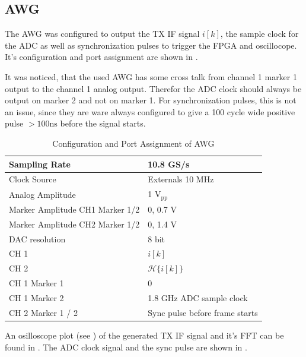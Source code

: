 \subsection{\gls{AWG}}
The \gls{AWG} was configured to output the \gls{TX} \gls{IF} signal $i[k]$,
the sample clock for the \gls{ADC} as well as synchronization pulses to trigger
the \gls{FPGA} and oscillocope. It's configuration and port assignment
are shown in .

It was noticed, that the used \gls{AWG} has some cross talk from
channel 1 marker 1 output to the channel 1 analog output. Therefor the
\gls{ADC} clock should always be output on marker 2 and not on marker 1.
For synchronization pulses, this is not an issue, since they are ware always
configured to give a 100 cycle wide positive pulse $> 100 \text{ns}$ before
the signal starts. \\

\begin{table}[h]
  \centering
  \begin{tabular}{|l|l|}
    \hline
    Sampling Rate & 10.8 GS/s \\ \hline
    Clock Source & Externals 10 MHz \\ \hline
    Analog Amplitude & 1 $\text{V}_{\text{pp}}$ \\ \hline
    Marker Amplitude CH1 Marker 1/2 & 0, 0.7 V \\ \hline
    Marker Amplitude CH2 Marker 1/2 & 0, 1.4 V \\ \hline
    \gls{DAC} resolution & 8 bit \\ \hline
    CH 1 & $i[k]$ \\ \hline
    CH 2 & $\mathcal{H}\{i[k]\}$ \\ \hline
    CH 1 Marker 1 & 0 \\ \hline
    CH 1 Marker 2 & 1.8 GHz \gls{ADC} sample clock \\ \hline
    CH 2 Marker 1 / 2 & Sync pulse before frame starts \\ \hline
  \end{tabular}
  \caption{Configuration and Port Assignment of \gls{AWG}}
  \label{tab:res_450_awg}
\end{table}

An osilloscope plot (see ) of the generated
\gls{TX} \gls{IF} signal and it's \gls{FFT} can be found in
.
The \gls{ADC} clock signal and the sync pulse are shown
in . \\

